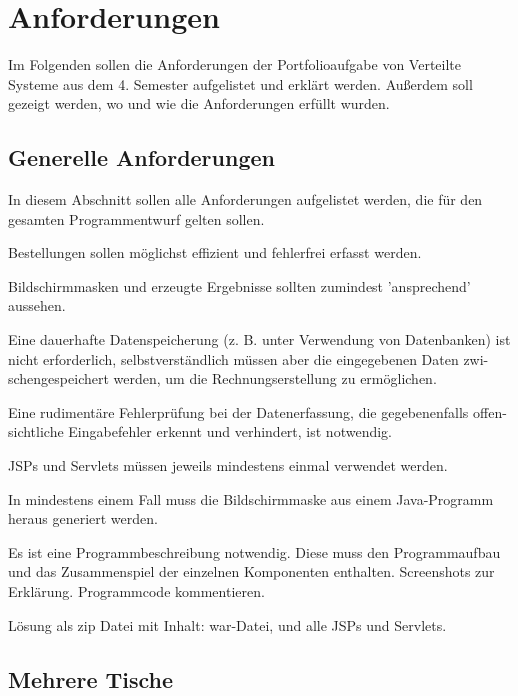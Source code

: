 \chapter{Anforderungen} %
\label{chap:Anforderungen}

Im Folgenden sollen die Anforderungen der Portfolioaufgabe von Verteilte Systeme aus dem 4. Semester aufgelistet und erklärt werden.
Außerdem soll gezeigt werden, wo und wie die Anforderungen erfüllt wurden.

\section{Generelle Anforderungen} %
\label{sec:Generelle Anforderungen}

In diesem Abschnitt sollen alle Anforderungen aufgelistet werden, die für den gesamten Programmentwurf gelten sollen.

Bestellungen sollen \glqq möglichst effizient und fehlerfrei erfasst werden.\grqq 

Bildschirmmasken und erzeugte Ergebnisse sollten \glqq zumindest 'ansprechend' aussehen.\grqq 

\glqq Eine dauerhafte Datenspeicherung (z. B. unter Verwendung von Datenbanken) ist
nicht erforderlich, selbstverständlich müssen aber die eingegebenen Daten zwi-
schengespeichert werden, um die Rechnungserstellung zu ermöglichen.\grqq

\glqq Eine rudimentäre Fehlerprüfung bei der Datenerfassung, die gegebenenfalls offen-
sichtliche Eingabefehler erkennt und verhindert, ist notwendig.\grqq

JSPs und Servlets müssen jeweils mindestens einmal verwendet werden.

In mindestens einem Fall muss die Bildschirmmaske aus einem Java-Programm heraus generiert werden.

Es ist eine Programmbeschreibung notwendig.
Diese muss den Programmaufbau und das Zusammenspiel der einzelnen Komponenten enthalten.
Screenshots zur Erklärung.
Programmcode kommentieren.

Lösung als zip Datei mit Inhalt: war-Datei, und alle JSPs und Servlets.


\section{Mehrere Tische} %
\label{sec:Mehrere Tische}

